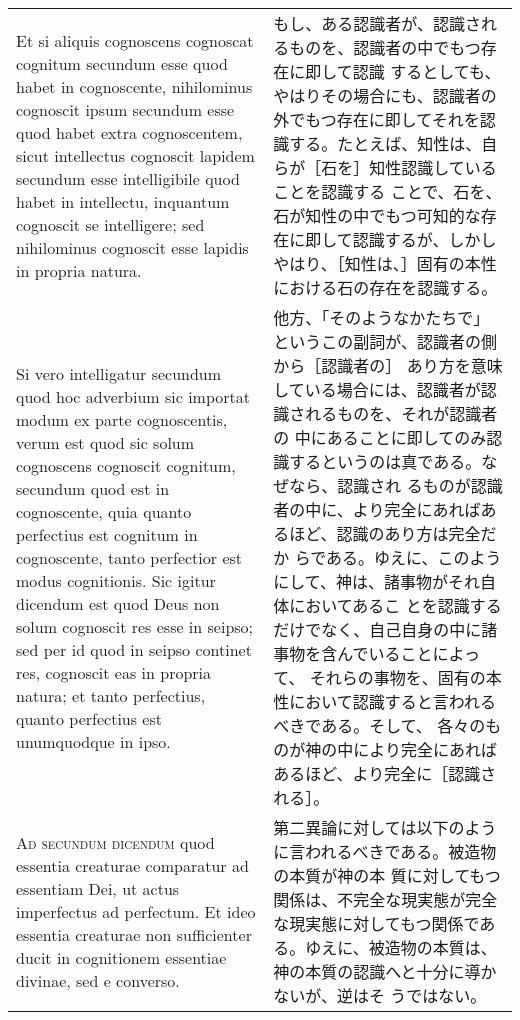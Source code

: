 \documentclass[10pt]{jsarticle} %
\begin{document}
\begin{longtable}{p{21em}p{21em}}
Et si aliquis cognoscens cognoscat cognitum secundum esse quod habet
in cognoscente, nihilominus cognoscit ipsum secundum esse quod habet
extra cognoscentem, sicut intellectus cognoscit lapidem secundum esse
intelligibile quod habet in intellectu, inquantum cognoscit se
intelligere; sed nihilominus cognoscit esse lapidis in propria natura.


&

もし、ある認識者が、認識されるものを、認識者の中でもつ存在に即して認識
するとしても、やはりその場合にも、認識者の外でもつ存在に即してそれを認
識する。たとえば、知性は、自らが［石を］知性認識していることを認識する
ことで、石を、石が知性の中でもつ可知的な存在に即して認識するが、しかし
やはり、［知性は、］固有の本性における石の存在を認識する。

\\



Si vero intelligatur secundum quod hoc adverbium sic importat modum ex
parte cognoscentis, verum est quod sic solum cognoscens cognoscit
cognitum, secundum quod est in cognoscente, quia quanto perfectius est
cognitum in cognoscente, tanto perfectior est modus cognitionis. Sic
igitur dicendum est quod Deus non solum cognoscit res esse in seipso;
sed per id quod in seipso continet res, cognoscit eas in propria
natura; et tanto perfectius, quanto perfectius est unumquodque in
ipso.

&

他方、「そのようなかたちで」というこの副詞が、認識者の側から［認識者の］
あり方を意味している場合には、認識者が認識されるものを、それが認識者の
中にあることに即してのみ認識するというのは真である。なぜなら、認識され
るものが認識者の中に、より完全にあればあるほど、認識のあり方は完全だか
らである。ゆえに、このようにして、神は、諸事物がそれ自体においてあるこ
とを認識するだけでなく、自己自身の中に諸事物を含んでいることによって、
それらの事物を、固有の本性において認識すると言われるべきである。そして、
各々のものが神の中により完全にあればあるほど、より完全に［認識される］。

\\


{\scshape Ad secundum dicendum} quod essentia creaturae comparatur ad
essentiam Dei, ut actus imperfectus ad perfectum. Et ideo essentia
creaturae non sufficienter ducit in cognitionem essentiae divinae, sed
e converso.


&

第二異論に対しては以下のように言われるべきである。被造物の本質が神の本
質に対してもつ関係は、不完全な現実態が完全な現実態に対してもつ関係であ
る。ゆえに、被造物の本質は、神の本質の認識へと十分に導かないが、逆はそ
うではない。


\end{longtable}
\end{document}
